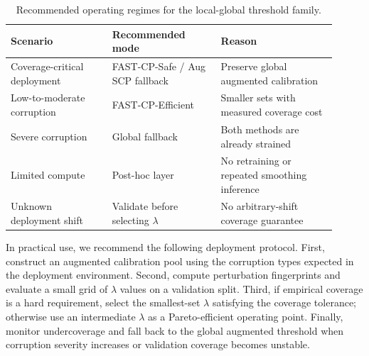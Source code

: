 \begin{table}[t]
\centering
\small
\caption{Recommended operating regimes for the local-global threshold family.}
\label{tab:operating_regimes}
\begin{tabular}{p{0.29\linewidth}p{0.30\linewidth}p{0.32\linewidth}}
\toprule
Scenario & Recommended mode & Reason \\
\midrule
Coverage-critical deployment & FAST-CP-Safe / Aug SCP fallback & Preserve global augmented calibration \\
Low-to-moderate corruption & FAST-CP-Efficient & Smaller sets with measured coverage cost \\
Severe corruption & Global fallback & Both methods are already strained \\
Limited compute & Post-hoc \fastcp{} layer & No retraining or repeated smoothing inference \\
Unknown deployment shift & Validate before selecting $\lambda$ & No arbitrary-shift coverage guarantee \\
\bottomrule
\end{tabular}
\end{table}

In practical use, we recommend the following deployment protocol. First, construct an augmented calibration pool using the corruption types expected in the deployment environment. Second, compute perturbation fingerprints and evaluate a small grid of $\lambda$ values on a validation split. Third, if empirical coverage is a hard requirement, select the smallest-set $\lambda$ satisfying the coverage tolerance; otherwise use an intermediate $\lambda$ as a Pareto-efficient operating point. Finally, monitor undercoverage and fall back to the global augmented threshold when corruption severity increases or validation coverage becomes unstable.
